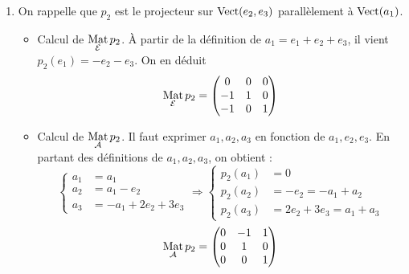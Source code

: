 \begin{enumerate}
\begin{itemize}
\item Calcul de $\underset{\mathcal{A E}}{\Mat}\, p_1$. 
De $a_1= e_1+e_2+e_3$ on déduit $p_1(a_1)=e_2+e_3$. De même  les autres colonnes s'obtiennent directement à partir des expressions des $a_i$ en fonction des $e_j$.
\begin{displaymath}
\underset{\mathcal{A E}}{\Mat}\, p_1 = 
\begin{pmatrix}
 0 & 0 & 0 \\
1 & 0  & 1 \\
 1 & 1 & 2
\end{pmatrix}
\end{displaymath}
\end{itemize}

\item On rappelle que $p_2$ est le projecteur sur $\operatorname{Vect} (e_2,e_3)$ parallèlement à $\operatorname{Vect} (a_1)$.
\begin{itemize}
 \item Calcul de $\underset{\mathcal{E}}{\operatorname{Mat}}\, p_2$. \`A partir de la définition de $a_1 = e_1+e_2+e_3$, il vient $p_2(e_1)=-e_2 -e_3$. On en déduit
\begin{displaymath}
\underset{\mathcal{E}}{\operatorname{Mat}}\, p_2 = 
\begin{pmatrix}
 0 & 0 & 0 \\
-1 & 1  & 0 \\
 -1 & 0 & 1
\end{pmatrix}
\end{displaymath}

\item Calcul de $\underset{\mathcal{A}}{\operatorname{Mat}}\, p_2$. Il faut exprimer $a_1,a_2, a_3$ en fonction de $a_1, e_2, e_3$. En partant des définitions de $a_1,a_2, a_3$, on obtient :
\begin{displaymath}
 \left\lbrace
\begin{aligned}
a_1&=a_1\\
a_2 &= a_1 -e_2 \\
a_3 &= -a_1+2e_2+3e_3
\end{aligned}
 \right. \Rightarrow
 \left\lbrace
\begin{aligned}
p_2(a_1)&=0\\
p_2(a_2) &= -e_2 = -a_1 +a_2 \\
p_2(a_3) &= 2e_2+3e_3 = a_1 + a_3
\end{aligned}
 \right.
\end{displaymath}
\begin{displaymath}
\underset{\mathcal{A}}{\operatorname{Mat}}\, p_2 =
\begin{pmatrix}
 0 & -1 & 1 \\
0 & 1  & 0 \\
 0 & 0 & 1
\end{pmatrix}
\end{displaymath}


\end{itemize}
\end{enumerate}
